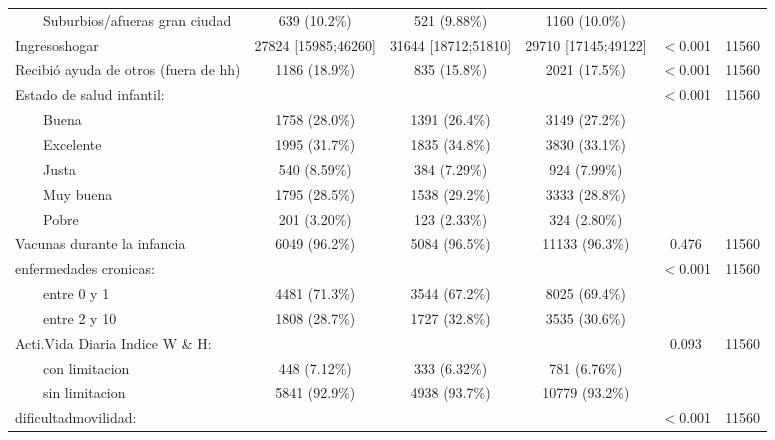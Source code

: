 \documentclass[a4paper,12pt, titlepage]{article}\usepackage[]{graphicx}\usepackage[]{color}
\begin{document}
\begin{landscape}
\begin{small}
\begin{longtable}{lccccc}
$\qquad$Suburbios‎/afueras gran ciudad &     639 (10.2\%)     &     521 (9.88\%)     &    1160 (10.0\%)     &           &      \\ 
Ingresoshogar & 27824 [15985;46260] & 31644 [18712;51810] & 29710 [17145;49122] &  $<$0.001   & 11560\\ 
Recibió ayuda de otros (fuera de hh) &    1186 (18.9\%)     &     835 (15.8\%)     &    2021 (17.5\%)     &  $<$0.001   & 11560\\ 
Estado de salud infantil: &                     &                     &                     &  $<$0.001   & 11560\\ 
$\qquad$Buena &    1758 (28.0\%)     &    1391 (26.4\%)     &    3149 (27.2\%)     &           &      \\ 
$\qquad$Excelente &    1995 (31.7\%)     &    1835 (34.8\%)     &    3830 (33.1\%)     &           &      \\ 
$\qquad$Justa &     540 (8.59\%)     &     384 (7.29\%)     &     924 (7.99\%)     &           &      \\ 
$\qquad$Muy buena &    1795 (28.5\%)     &    1538 (29.2\%)     &    3333 (28.8\%)     &           &      \\ 
$\qquad$Pobre &     201 (3.20\%)     &     123 (2.33\%)     &     324 (2.80\%)     &           &      \\ 
Vacunas durante la infancia &    6049 (96.2\%)     &    5084 (96.5\%)     &    11133 (96.3\%)    &   0.476   & 11560\\ 
enfermedades cronicas: &                     &                     &                     &  $<$0.001   & 11560\\ 
$\qquad$entre 0 y 1 &    4481 (71.3\%)     &    3544 (67.2\%)     &    8025 (69.4\%)     &           &      \\ 
$\qquad$entre 2 y 10 &    1808 (28.7\%)     &    1727 (32.8\%)     &    3535 (30.6\%)     &           &      \\ 
Acti.Vida Diaria Indice W \& H: &                     &                     &                     &   0.093   & 11560\\ 
$\qquad$con limitacion &     448 (7.12\%)     &     333 (6.32\%)     &     781 (6.76\%)     &           &      \\ 
$\qquad$sin limitacion &    5841 (92.9\%)     &    4938 (93.7\%)     &    10779 (93.2\%)    &           &      \\ 
dificultadmovilidad: &                     &                     &                     &  $<$0.001   & 11560\\ 

\end{longtable}
\end{small}
\end{landscape}
\end{document}
